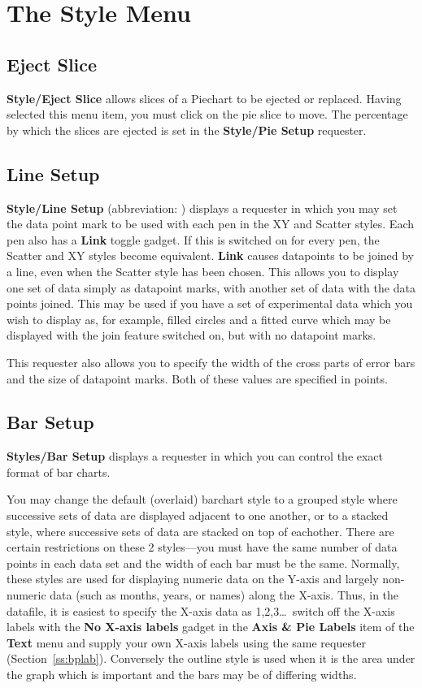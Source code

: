 \section{The Style Menu}

\subsection{Eject Slice}
{\bf Style/Eject Slice} allows slices of a Piechart to be 
ejected or replaced. 
Having selected this menu item, you must click on the pie slice to move. The 
percentage by which the slices are ejected is set in the {\bf Style/Pie Setup} 
requester.

\subsection{Line Setup}
\label{ss:dp}
{\bf Style/Line Setup}  (abbreviation: ) displays a 
requester in which you may set the data point mark 
to be used with each pen in the XY and Scatter styles. Each pen also has a {\bf Link}
toggle gadget. If this is switched on for every pen, the Scatter and XY styles become 
equivalent. {\bf Link} causes datapoints to be joined by a line, even 
when the Scatter 
style has been chosen. This allows you to display one set of data simply as 
datapoint marks, with another set of data with the data points joined. This may 
be used if you have a set of experimental data which you wish to display as, for 
example, filled circles and a fitted curve which may be displayed with the join 
feature switched on, but with no datapoint marks. 

This requester also allows you to specify the width of the cross parts of error 
bars and the size of datapoint marks. Both of these values are specified in points.

\subsection{Bar Setup}
\label{ss:barstyle}
{\bf Styles/Bar Setup}  displays a requester in which 
you can control the exact format of bar charts.

You may change the default (overlaid) barchart style to a grouped style 
 where successive sets of data are displayed adjacent to one 
another, or to a stacked style, where successive sets of data are stacked on top 
of eachother. There are certain restrictions on these 2 styles---you must have the 
same number of data points in each data set and the width of each bar must be the 
same. Normally, these styles are used for displaying numeric data on the Y-axis and 
largely non-numeric data (such as months, years, or names) along the X-axis. 
Thus, in the datafile, it is easiest to specify the X-axis data as 1,2,3\ldots\ 
switch off the X-axis labels with the {\bf No X-axis labels} gadget in the 
{\bf Axis \& Pie Labels} item of the {\bf Text} menu and supply your own X-axis 
labels using the same requester (Section~\ref{ss:bplab}).
Conversely the outline style  is used when it is the area under 
the graph which is important and the bars may be of differing widths.

